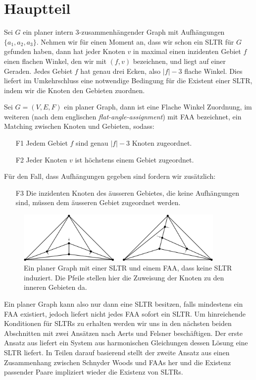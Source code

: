 \chapter{Hauptteil}

Sei $G$ ein planer intern 3-zusammenhängender Graph mit Aufhängungen $\{a_1,a_2,a_3\}$. Nehmen wir für einen Moment an, dass wir schon ein SLTR für $G$ gefunden haben, dann hat jeder Knoten $v$ in maximal einen inzidenten Gebiet $f$ einen flachen Winkel, den wir mit $(f,v)$ bezeichnen, und liegt auf einer Geraden. Jedes Gebiet $f$ hat genau drei Ecken, also $|f|-3$ flache Winkel. Dies liefert im Umkehrschluss eine notwendige Bedingung für die Existent einer SLTR, indem wir die Knoten den Gebieten zuordnen.

\begin{definition}[FAA]
Sei $G=(V,E,F)$ ein planer Graph, dann ist eine Flache Winkel Zuordnung, im weiteren (nach dem englischen \textit{flat-angle-assignment}) mit FAA bezeichnet, ein Matching zwischen Knoten und Gebieten, sodass:
\begin{itemize}
\item [F1] Jedem Gebiet $f$ sind genau $|f|-3$ Knoten zugeordnet.
\item [F2] Jeder Knoten $v$ ist höchstens einem Gebiet zugeordnet.
\end{itemize}
Für den Fall, dass Aufhängungen gegeben sind fordern wir zusätzlich:
\begin{itemize}
\item [F3] Die inzidenten Knoten des äusseren Gebietes, die keine Aufhängungen sind, müssen dem äusseren Gebiet zugeordnet werden.
\end{itemize}

\begin{figure}[h]
	\centering
  \includegraphics[width=0.9\textwidth]{faa_def.png}
  \caption{Ein planer Graph mit einer SLTR und einem FAA, dass keine SLTR induziert. Die Pfeile stellen hier die Zuweisung der Knoten zu den inneren Gebieten da.}
\end{figure}

\end{definition}

Ein planer Graph kann also nur dann eine SLTR besitzen, falls mindestens ein FAA existiert, jedoch liefert nicht jedes FAA sofort ein SLTR. Um hinreichende Konditionen für SLTRs zu erhalten werden wir uns in den nächsten beiden Abschnitten mit zwei Ansätzen nach Aerts und Felsner beschäftigen. Der erste Ansatz aus \cite{af13} liefert ein System aus harmonischen Gleichungen dessen Lösung eine SLTR liefert. In Teilen darauf basierend stellt der zweite Ansatz aus \cite{af15} einen Zusammenhang zwischen Schnyder Woods und FAAs her und die Existenz passender Paare impliziert wieder die Existenz von SLTRs.

